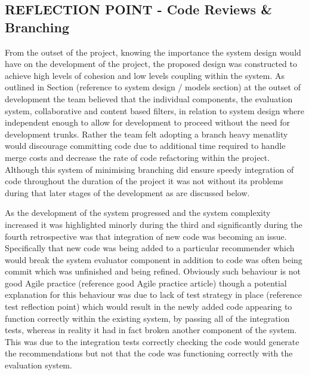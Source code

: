 \documentclass{l3proj}
\begin{document}
\subsection{REFLECTION POINT - Code Reviews \& Branching}
\label{sec:codereviewbranch}

From the outset of the project, knowing the importance the system design would have on the development of the project, the proposed design was constructed to achieve high levels of cohesion and low levels coupling within the system. As outlined in Section (reference to system design / models section) at the outset of development the team believed that the individual components, the evaluation system, collaborative and content based filters, in relation to system design where independent enough to allow for development to proceed without the need for development trunks. Rather the team felt adopting a branch heavy menatlity would discourage committing code due to additional time required to handle merge costs and decrease the rate of code refactoring within the project. Although this system of minimising branching did ensure speedy integration of code throughout the duration of the project it was not without its problems during that later stages of the development as are discussed below.

As the development of the system progressed and the system complexity increased it was highlighted minorly during the third and significantly during the fourth retrospective was that integration of new code was becoming an issue. Specifically that new code was being added to a particular recommender which would break the system evaluator component in addition to code was often being commit which was unfinished and being refined. Obviously such behaviour is not good Agile practice (reference good Agile practice article) though a potential explanation for this behaviour was due to lack of test strategy in place (reference test reflection point) which would result in the newly added code appearing to function correctly within the existing system, by passing all of the integration tests, whereas in reality it had in fact broken another component of the system. This was due to the integration tests correctly checking the code would generate the recommendations but not that the code was functioning correctly with the evaluation system.
\end{document}
